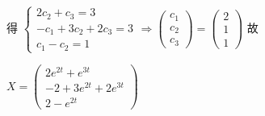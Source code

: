 \begin{enumerate}
			       得 \( \begin{cases}
				       2c_{2} + c_{3} = 3           \\
				       -c_{1} + 3c_{2} + 2c_{3} = 3 \\
				       c_{1} - c_{2} = 1
			       \end{cases} \Rightarrow \begin{pmatrix}
				       c_{1} \\
				       c_{2} \\
				       c_{3}
			       \end{pmatrix} = \begin{pmatrix}
				       2 \\
				       1 \\
				       1
			       \end{pmatrix} \) 故

			       \( X = \begin{pmatrix}
				       2e^{2t} + e^{3t}       \\
				       -2 + 3e^{2t} + 2e^{3t} \\
				       2 - e^{2t}
			       \end{pmatrix} \)
		 \end{enumerate}


